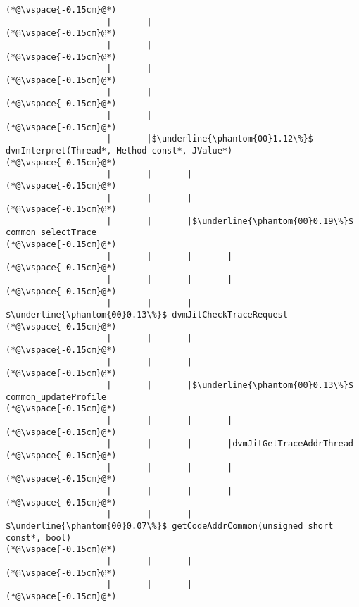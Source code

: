 \begin{lstlisting}[caption=Metodikutsu C$\to$Java 20 viiteparametrilla, label=profile:C2JBenchmark00206, numberbychapter=true, frame=lines, float, floatplacement=t]
(*@\vspace{-0.15cm}@*)
                    |       |
(*@\vspace{-0.15cm}@*)
                    |       |
(*@\vspace{-0.15cm}@*)
                    |       |
(*@\vspace{-0.15cm}@*)
                    |       |
(*@\vspace{-0.15cm}@*)
                    |       |
(*@\vspace{-0.15cm}@*)
                    |       |$\underline{\phantom{00}1.12\%}$ dvmInterpret(Thread*, Method const*, JValue*)
(*@\vspace{-0.15cm}@*)
                    |       |       |
(*@\vspace{-0.15cm}@*)
                    |       |       |
(*@\vspace{-0.15cm}@*)
                    |       |       |$\underline{\phantom{00}0.19\%}$ common_selectTrace
(*@\vspace{-0.15cm}@*)
                    |       |       |       |
(*@\vspace{-0.15cm}@*)
                    |       |       |       |
(*@\vspace{-0.15cm}@*)
                    |       |       |        $\underline{\phantom{00}0.13\%}$ dvmJitCheckTraceRequest
(*@\vspace{-0.15cm}@*)
                    |       |       |
(*@\vspace{-0.15cm}@*)
                    |       |       |
(*@\vspace{-0.15cm}@*)
                    |       |       |$\underline{\phantom{00}0.13\%}$    common_updateProfile
(*@\vspace{-0.15cm}@*)
                    |       |       |       |
(*@\vspace{-0.15cm}@*)
                    |       |       |       |dvmJitGetTraceAddrThread
(*@\vspace{-0.15cm}@*)
                    |       |       |       |
(*@\vspace{-0.15cm}@*)
                    |       |       |       |
(*@\vspace{-0.15cm}@*)
                    |       |       |        $\underline{\phantom{00}0.07\%}$ getCodeAddrCommon(unsigned short const*, bool)
(*@\vspace{-0.15cm}@*)
                    |       |       |
(*@\vspace{-0.15cm}@*)
                    |       |       |
(*@\vspace{-0.15cm}@*)

\end{lstlisting}
